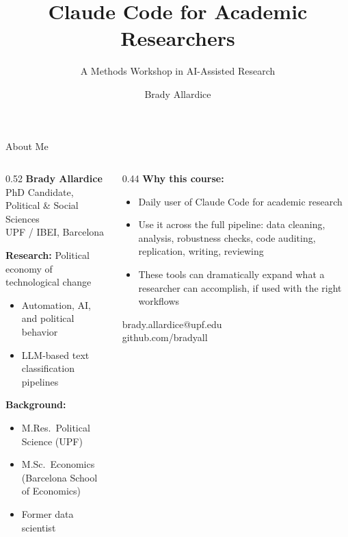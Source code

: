 \documentclass[aspectratio=169, 11pt]{beamer}
\title{Claude Code for Academic Researchers}
\subtitle{A Methods Workshop in AI-Assisted Research}
\author{Brady Allardice}
\date{}
\institute{UPF \& IBEI}
\begin{document}
\begin{frame}[plain]
  \titlepage
\end{frame}

\begin{frame}{About Me}
  \begin{columns}[T]
    \begin{column}{0.52\textwidth}
      \textbf{Brady Allardice}\\
      PhD Candidate, Political \& Social Sciences\\
      UPF / IBEI, Barcelona

      \vspace{0.5em}
      \textbf{Research:} Political economy of technological change
      \begin{itemize}
        \item Automation, AI, and political behavior
        \item LLM-based text classification pipelines
      \end{itemize}

      \vspace{0.5em}
      \textbf{Background:}
      \begin{itemize}
        \item M.Res.\ Political Science (UPF)
        \item M.Sc.\ Economics (Barcelona School of Economics)
        \item Former data scientist
      \end{itemize}
    \end{column}
    \begin{column}{0.44\textwidth}
      \textbf{Why this course:}
      \begin{itemize}
        \item Daily user of Claude Code for academic research
        \item Use it across the full pipeline: data cleaning, analysis, robustness checks, code auditing, replication, writing, reviewing
        \item These tools can dramatically expand what a researcher can accomplish, if used with the right workflows
      \end{itemize}

      \vspace{0.5em}
      {\small brady.allardice@upf.edu\\github.com/bradyall}
    \end{column}
  \end{columns}
\end{frame}
\end{document}
